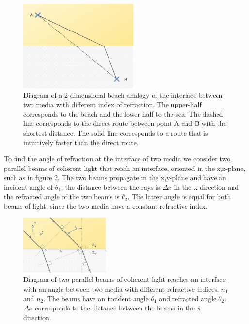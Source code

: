 \documentclass{article}
\begin{document}
\begin{figure}[h!]
	\centering
	\includegraphics[width=6cm]{afbeeldingen/snell_diagram_leeg.jpg}
	\caption{Diagram of a 2-dimensional beach analogy of the interface between two media with different index of refraction. The upper-half corresponds to the beach and the lower-half to the sea. The dashed line corresponds to the direct route between point A and B with the shortest distance. The solid line corresponds to a route that is intuitively faster than the direct route.}
	\label{fig_snell_empty}
\end{figure}

To find the angle of refraction at the interface of two media we consider two parallel beams of coherent light that reach an interface, oriented in the x,z-plane, such as in figure \ref{fig_snell_geom_empty}. The two beams propagate in the x,y-plane and have an incident angle of $\theta_1$, the distance between the rays is $\Delta x$ in the x-direction and the refracted angle of the two beams is $\theta _2$. The latter angle is equal for both beams of light, since the two media have a constant refractive index. \\

\begin{figure}[h!]
	\centering
	\includegraphics[width=0.4\textwidth]{afbeeldingen/snell_geom_empty.jpg}
	\caption{Diagram of two parallel beams of coherent light reaches an interface  with an angle between two media with different refractive indices, $n_1$ and $n_2$. The beams have an incident angle $ \theta_1$ and refracted angle $\theta_2$. $\Delta x$ corresponds to the distance between the beams in the x direction. }
	\label{fig_snell_geom_empty}
\end{figure}
\end{document}
